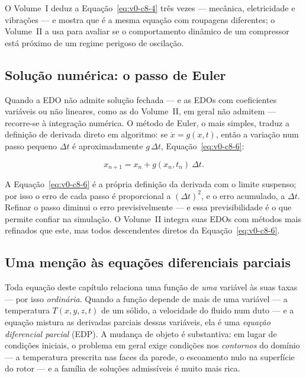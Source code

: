 \documentclass[12pt,a4paper]{article}
\numberwithin{equation}{section}
\numberwithin{table}{section}
\numberwithin{figure}{section}
\begin{document}
O Volume~I deduz a Equação~\eqref{eq:v0-c8-4} três vezes --- mecânica,
eletricidade e vibrações --- e mostra que é a mesma equação com roupagens
diferentes; o Volume~II a usa para avaliar se o comportamento dinâmico de
um compressor está próximo de um regime perigoso de oscilação.

\subsection{Solução numérica: o passo de Euler}

Quando a EDO não admite solução fechada --- e as EDOs com coeficientes
variáveis ou não lineares, como as do Volume~II, em geral não admitem ---
recorre-se à integração numérica. O método de Euler, o mais simples,
traduz a definição de derivada direto em algoritmo: se
$\dot{x} = g(x,t)$, então a variação num passo pequeno $\Delta t$ é
aproximadamente $g\,\Delta t$, Equação~\eqref{eq:v0-c8-6}:

\begin{equation}\label{eq:v0-c8-6}
x_{n+1} = x_n + g(x_n, t_n)\ \Delta t.
\end{equation}

A Equação~\eqref{eq:v0-c8-6} é a própria definição da derivada com o
limite suspenso; por isso o erro de cada passo é proporcional a
$(\Delta t)^2$, e o erro acumulado, a $\Delta t$. Refinar o passo
diminui o erro previsivelmente --- e essa previsibilidade é o que permite
confiar na simulação. O Volume~II integra suas EDOs com métodos mais
refinados que este, mas todos descendentes diretos da
Equação~\eqref{eq:v0-c8-6}.

\subsection{Uma menção às equações diferenciais parciais}

Toda equação deste capítulo relaciona uma função de \emph{uma} variável às
suas taxas --- por isso \emph{ordinária}. Quando a função depende de mais
de uma variável --- a temperatura $T(x,y,z,t)$ de um sólido, a velocidade
do fluido num duto --- e a equação mistura as derivadas parciais dessas
variáveis, ela é uma \emph{equação diferencial parcial} (EDP). A mudança
de objeto é substantiva: em lugar de condições iniciais, o problema em
geral exige condições nos \emph{contornos} do domínio --- a temperatura
prescrita nas faces da parede, o escoamento nulo na superfície do rotor ---
e a família de soluções admissíveis é muito mais rica.
\end{document}
